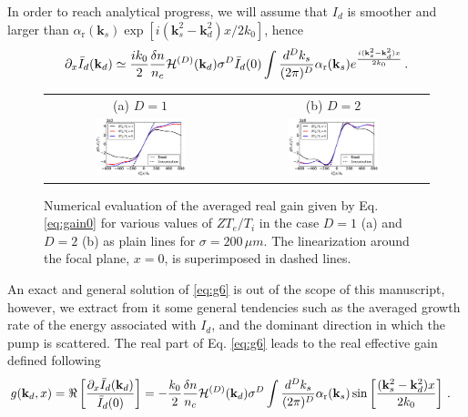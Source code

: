 \documentclass[
 reprint,
 amsmath,amssymb,
 aps,
]{revtex4-1}
\begin{document}
\begin{widetext}
In order to reach analytical progress, we will assume that $I_d$ is  smoother and larger  than $\alpha_\mathrm{r}(\mathbf{k}_s) 
\exp[i(\mathbf{k}_s^2-\mathbf{k}_d^2)x / 2k_0]$, hence 
\begin{align}
\partial_x\Bar{I}_d(\mathbf{k}_d)\simeq  \frac{ik_0}{2}  \frac{\delta n}{n_c}
 \mathcal{H}^{(D)}(\mathbf{k}_d) \sigma^D \Bar{I}_d(0) \int \frac{d^Dk_s}{(2\pi)^D}  \alpha_\mathrm{r}(\mathbf{k}_s) 
e^{\frac{i(\mathbf{k}_s^2-\mathbf{k}_d^2)x}{2k_0}} 
\, . \label{eq:g6}
\end{align}
 
  \begin{figure}
\begin{tabular}{cc}
(a) $D=1$ &(b) $D=2$ \\
\includegraphics[width=0.49\textwidth]{int_akin_sin.eps}
 &
\includegraphics[width=0.49\textwidth]{int_akin_sin_D2.eps}
\end{tabular}
\caption{ \label{fig:intakinsin}
Numerical evaluation of the averaged real gain given by Eq. \eqref{eq:gain0} for various values of $ZT_e/T_i$ in the case $D=1$ (a) and $D=2$ (b) as plain lines for $\sigma = 200 \,\mu m$. The linearization around the focal plane, $x=0$, is superimposed in dashed lines. 
 }
\end{figure}
An exact and general solution of \eqref{eq:g6} is out of the scope of this manuscript, however, we extract from it some general tendencies such as the averaged growth rate of the energy associated with $I_d$, and the dominant direction in which the pump is scattered. The real part of  Eq. \eqref{eq:g6} leads to the real effective  gain defined following
\begin{align}
&g(\mathbf{k}_d,x) = \Re\left[\frac{\partial_x\Bar{I}_d(\mathbf{k}_d)}{\Bar{I}_d(0)}\right] %
= - \frac{k_0}{2}  \frac{\delta n}{n_c}
 \mathcal{H}^{(D)}(\mathbf{k}_d)  \sigma^D \int \frac{d^Dk_s}{(2\pi)^D}  \alpha_\mathrm{r}(\mathbf{k}_s) 
\sin\left[ \frac{(\mathbf{k}_s^2-\mathbf{k}_d^2)x}{2k_0}\right]
\, . \label{eq:gainkd}
\end{align}
 \end{widetext}
\end{document}
